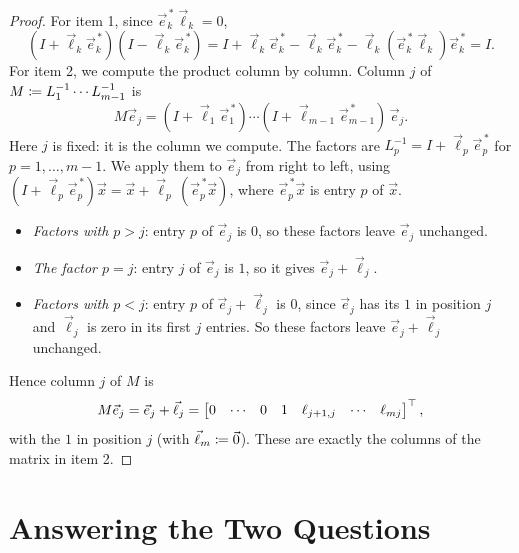 \begin{proof}
  For item 1, since $\vec{e}_k^{\,\ast}\vec{\ell}_k = 0$,
  \begin{equation}
    (I + \vec{\ell}_k\vec{e}_k^{\,\ast})(I - \vec{\ell}_k\vec{e}_k^{\,\ast}) = I + \vec{\ell}_k\vec{e}_k^{\,\ast} - \vec{\ell}_k\vec{e}_k^{\,\ast} - \vec{\ell}_k(\vec{e}_k^{\,\ast}\vec{\ell}_k)\vec{e}_k^{\,\ast} = I.
  \end{equation}
  For item 2, we compute the product column by column. Column $j$ of $M \coloneqq L_1^{-1} \cdots L_{m-1}^{-1}$ is
  \begin{equation}
    M\vec{e}_j = (I + \vec{\ell}_1\vec{e}_1^{\,\ast}) \cdots (I + \vec{\ell}_{m-1}\vec{e}_{m-1}^{\,\ast})\,\vec{e}_j.
  \end{equation}
  Here $j$ is fixed: it is the column we compute. The factors are $L_p^{-1} = I + \vec{\ell}_p\vec{e}_p^{\,\ast}$ for $p = 1, \dots, m - 1$. We apply them to $\vec{e}_j$ from right to left, using $(I + \vec{\ell}_p\vec{e}_p^{\,\ast})\vec{x} = \vec{x} + \vec{\ell}_p\,(\vec{e}_p^{\,\ast}\vec{x})$, where $\vec{e}_p^{\,\ast}\vec{x}$ is entry $p$ of $\vec{x}$.
  \begin{itemize}
    \item \emph{Factors with $p > j$}: entry $p$ of $\vec{e}_j$ is $0$, so these factors leave $\vec{e}_j$ unchanged.
    \item \emph{The factor $p = j$}: entry $j$ of $\vec{e}_j$ is $1$, so it gives $\vec{e}_j + \vec{\ell}_j$.
    \item \emph{Factors with $p < j$}: entry $p$ of $\vec{e}_j + \vec{\ell}_j$ is $0$, since $\vec{e}_j$ has its $1$ in position $j$ and $\vec{\ell}_j$ is zero in its first $j$ entries. So these factors leave $\vec{e}_j + \vec{\ell}_j$ unchanged.
  \end{itemize}
  Hence column $j$ of $M$ is
  \begin{equation}
    M\vec{e}_j = \vec{e}_j + \vec{\ell}_j = \begin{bmatrix} 0 & \cdots & 0 & 1 & \ell_{j+1,j} & \cdots & \ell_{mj} \end{bmatrix}^\top,
  \end{equation}
  with the $1$ in position $j$ (with $\vec{\ell}_m \coloneqq \vec{0}$). These are exactly the columns of the matrix in item 2.
\end{proof}

\section{Answering the Two Questions}


